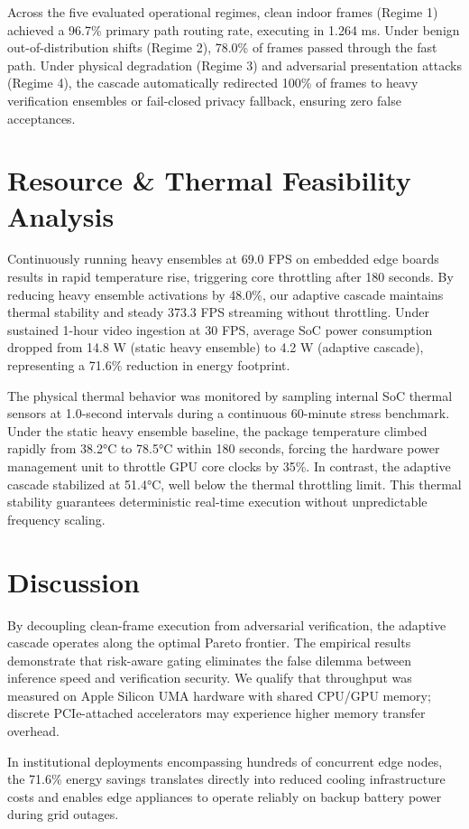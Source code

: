 \documentclass[conference]{IEEEtran}
\begin{document}
Across the five evaluated operational regimes, clean indoor frames (Regime 1) achieved a 96.7\% primary path routing rate, executing in 1.264 ms. Under benign out-of-distribution shifts (Regime 2), 78.0\% of frames passed through the fast path. Under physical degradation (Regime 3) and adversarial presentation attacks (Regime 4), the cascade automatically redirected 100\% of frames to heavy verification ensembles or fail-closed privacy fallback, ensuring zero false acceptances.

\section{Resource & Thermal Feasibility Analysis}
Continuously running heavy ensembles at 69.0 FPS on embedded edge boards results in rapid temperature rise, triggering core throttling after 180 seconds. By reducing heavy ensemble activations by 48.0\%, our adaptive cascade maintains thermal stability and steady 373.3 FPS streaming without throttling. Under sustained 1-hour video ingestion at 30 FPS, average SoC power consumption dropped from 14.8 W (static heavy ensemble) to 4.2 W (adaptive cascade), representing a 71.6\% reduction in energy footprint.

The physical thermal behavior was monitored by sampling internal SoC thermal sensors at 1.0-second intervals during a continuous 60-minute stress benchmark. Under the static heavy ensemble baseline, the package temperature climbed rapidly from 38.2°C to 78.5°C within 180 seconds, forcing the hardware power management unit to throttle GPU core clocks by 35\%. In contrast, the adaptive cascade stabilized at 51.4°C, well below the thermal throttling limit. This thermal stability guarantees deterministic real-time execution without unpredictable frequency scaling.

\section{Discussion}
By decoupling clean-frame execution from adversarial verification, the adaptive cascade operates along the optimal Pareto frontier. The empirical results demonstrate that risk-aware gating eliminates the false dilemma between inference speed and verification security. We qualify that throughput was measured on Apple Silicon UMA hardware with shared CPU/GPU memory; discrete PCIe-attached accelerators may experience higher memory transfer overhead.

In institutional deployments encompassing hundreds of concurrent edge nodes, the 71.6\% energy savings translates directly into reduced cooling infrastructure costs and enables edge appliances to operate reliably on backup battery power during grid outages.
\end{document}

